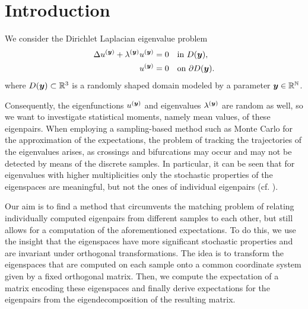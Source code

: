 \chapter{Introduction}
We consider the Dirichlet Laplacian eigenvalue problem
\begin{subequations}
    \label{eq:og-prob}
    \begin{align}
        \Delta u^{(\bs{y})} + \lambda^{(\bs{y})} u^{(\bs{y})} = 0\quad&\text{in}\ D(\bs{y}),\\ \label{eq:og-prob-domain}
        u^{(\bs{y})} = 0\quad&\text{on}\ \partial D(\bs{y}).
    \end{align}
\end{subequations}
where $D({\boldsymbol y}) \subset \mathbb{R}^3$ is a randomly shaped domain modeled by a parameter ${\boldsymbol y} \in \mathbb{R}^{\mathbb{N}}$.

Consequently, the eigenfunctions $u^{({\boldsymbol y})}$ and eigenvalues $\lambda^{({\boldsymbol y})}$ are random as well, so we want to investigate statistical moments, namely mean values, of these eigenpairs.
When employing a sampling-based method such as Monte Carlo for the approximation of the expectations, the problem of tracking the trajectories of the eigenvalues arises, as crossings and bifurcations may occur and may not be detected by means of the discrete samples.
In particular, it can be seen that for eigenvalues with higher multiplicities only the stochastic properties of the eigenspaces are meaningful, but not the ones of individual eigenpairs (cf. \cite{Doelz_Ebert_2024}).

Our aim is to find a method that circumvents the matching problem of relating individually computed eigenpairs from different samples to each other, but still allows for a computation of the aforementioned expectations.
To do this, we use the insight that the eigenspaces have more significant stochastic properties and are invariant under orthogonal transformations.
The idea is to transform the eigenspaces that are computed on each sample onto a common coordinate system given by a fixed orthogonal matrix.
Then, we compute the expectation of a matrix encoding these eigenspaces and finally derive expectations for the eigenpairs from the eigendecomposition of the resulting matrix.


